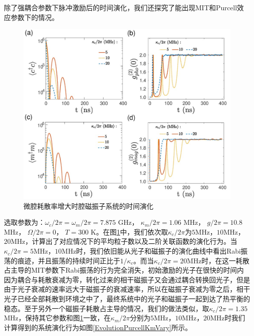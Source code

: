 除了强耦合参数下脉冲激励后的时间演化，我们还探究了能出现MIT和Purcell效应参数下的情况。
\begin{figure}[htbp]
	\centering
	\includegraphics[width=2\basefigurewidth]{./figure/5_12}
	\caption{微腔耗散率增大时腔磁振子系统的时间演化} 
	\label{EvolutionMITKcVary}
\end{figure}
选取参数为：$\omega_c/2\pi=\omega_m/2\pi=7.875$ GHz， $\kappa_m/2\pi=1.06$ MHz， $g/2\pi=10.8$ MHz， $\Omega/2\pi=0$， $T=300$ K。在图\ref{EvolutionMITKcVary}中，我们依次取$\kappa_c/2\pi$为$5$MHz，$10$MHz，$20$MHz，计算出了对应情况下的平均粒子数以及二阶关联函数的演化行为。当$\kappa_c/2\pi=5$MHz，$10$MHz时，我们依旧能从光子和磁振子的演化曲线中看出Rabi振荡的痕迹，并且振荡的持续时间正比于$1/\kappa_c$。而当$\kappa_c/2\pi=20$MHz时，在这一耗散占主导的MIT参数下Rabi振荡的行为完全消失，初始激励的光子在很快的时间内因为耦合与耗散衰减为零，转化过来的相干磁振子又会通过耦合转换回光子，但是由于光子衰减的速率远大于磁振子的衰减速率，所以在磁振子衰减为零之后，相干光子已经全部耗散到环境之中了，最终系统中的光子和磁振子一起到达了热平衡的稳态。至于另外一个磁振子耗散占主导的情况，我们的做法类似，取$\kappa_c/2\pi=1.35$ MHz，保持其它参数和图\ref{EvolutionMITKcVary}一致，在$\kappa_m/2\pi$分别为$5$MHz，$10$MHz，$20$MHz时我们计算得到的系统演化行为如图\ref{EvolutionPurcellKmVary}所示。
